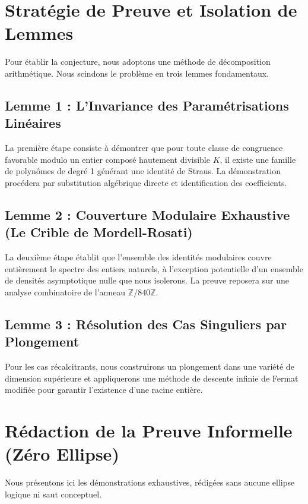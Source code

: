 \documentclass[11pt,a4paper]{article}
\begin{document}
\section{Stratégie de Preuve et Isolation de Lemmes}
\label{sec:strategy}

Pour établir la conjecture, nous adoptons une méthode de décomposition arithmétique. Nous scindons le problème en trois lemmes fondamentaux.

\subsection{Lemme 1 : L'Invariance des Paramétrisations Linéaires}
La première étape consiste à démontrer que pour toute classe de congruence favorable modulo un entier composé hautement divisible $K$, il existe une famille de polynômes de degré 1 générant une identité de Straus.
La démonstration procédera par substitution algébrique directe et identification des coefficients.

\subsection{Lemme 2 : Couverture Modulaire Exhaustive (Le Crible de Mordell-Rosati)}
La deuxième étape établit que l'ensemble des identités modulaires couvre entièrement le spectre des entiers naturels, à l'exception potentielle d'un ensemble de densités asymptotique nulle que nous isolerons.
La preuve reposera sur une analyse combinatoire de l'anneau $\mathbb{Z}/840\mathbb{Z}$.

\subsection{Lemme 3 : Résolution des Cas Singuliers par Plongement}
Pour les cas récalcitrants, nous construirons un plongement dans une variété de dimension supérieure et appliquerons une méthode de descente infinie de Fermat modifiée pour garantir l'existence d'une racine entière.


\section{Rédaction de la Preuve Informelle (Zéro Ellipse)}
\label{sec:proofs}

Nous présentons ici les démonstrations exhaustives, rédigées sans aucune ellipse logique ni saut conceptuel.
\end{document}
